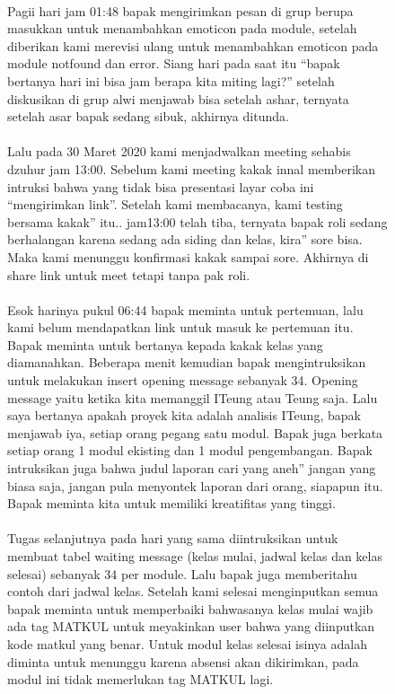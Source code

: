 \documentclass{book}
\begin{document}
\begin{enumerate}
\begin{figure} [ht]
\paragraph{} \quad Pagii hari jam 01:48 bapak mengirimkan pesan di grup berupa masukkan untuk menambahkan emoticon pada module, setelah diberikan kami merevisi ulang untuk menambahkan emoticon pada module notfound dan error. Siang hari pada saat itu “bapak bertanya hari ini bisa jam berapa kita miting lagi?” setelah diskusikan di grup alwi menjawab bisa setelah ashar, ternyata setelah asar bapak sedang sibuk, akhirnya ditunda.
\paragraph{} \quad Lalu pada 30 Maret 2020 kami menjadwalkan meeting sehabis dzuhur jam 13:00. Sebelum kami meeting kakak innal memberikan intruksi bahwa yang tidak bisa presentasi layar coba ini “mengirimkan link”. Setelah kami membacanya, kami testing bersama kakak” itu.. jam13:00 telah tiba, ternyata bapak roli sedang berhalangan karena sedang ada siding dan kelas, kira” sore bisa. Maka kami menunggu konfirmasi kakak sampai sore. Akhirnya di share link untuk meet tetapi tanpa pak roli.
\paragraph{}\quad Esok harinya pukul 06:44 bapak meminta untuk pertemuan, lalu kami belum mendapatkan link untuk masuk ke pertemuan itu. Bapak meminta untuk bertanya kepada kakak kelas yang diamanahkan. Beberapa menit kemudian bapak mengintruksikan untuk melakukan insert opening message sebanyak 34. Opening message yaitu ketika kita memanggil ITeung atau Teung saja. Lalu saya bertanya apakah proyek kita adalah analisis ITeung, bapak menjawab iya, setiap orang pegang satu modul. Bapak juga berkata setiap orang 1 modul ekisting dan 1 modul pengembangan. Bapak intruksikan juga bahwa judul laporan cari yang aneh” jangan yang biasa saja, jangan pula menyontek laporan dari orang, siapapun itu. Bapak meminta kita untuk memiliki kreatifitas yang tinggi.
\paragraph{} \quad Tugas selanjutnya pada hari yang sama diintruksikan untuk membuat tabel waiting message (kelas mulai, jadwal kelas dan kelas selesai) sebanyak 34 per module. Lalu bapak juga memberitahu contoh dari jadwal kelas. Setelah kami selesai menginputkan semua bapak meminta untuk memperbaiki bahwasanya kelas mulai wajib ada tag MATKUL untuk meyakinkan user bahwa yang diinputkan kode matkul yang benar. Untuk modul kelas selesai isinya adalah diminta untuk menunggu karena absensi akan dikirimkan, pada modul ini tidak memerlukan tag MATKUL lagi. 

\end{figure}
\end{enumerate}
\end{document}

